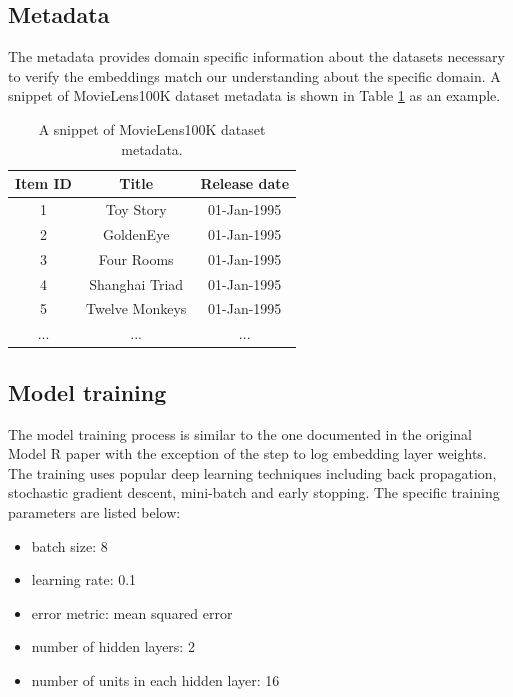 \documentclass[conference]{IEEEtran}
\begin{document}
\subsection{Metadata}
The metadata provides domain specific information about the datasets necessary to verify the embeddings match our understanding about the specific domain. A snippet of MovieLens100K dataset metadata is shown in Table \ref{tab:movielens100kmeta} as an example.
\begin{table}[!ht]
	\centering
	\caption{A snippet of MovieLens100K dataset metadata.}
	\begin{tabular}{ccc} \hline \rowcolor{blue!30}
		Item ID & Title & Release date \\ \hline
		1 & Toy Story & 01-Jan-1995 \\ \hline
		2 & GoldenEye & 01-Jan-1995 \\ \hline
		3 & Four Rooms & 01-Jan-1995 \\ \hline
		4 & Shanghai Triad & 01-Jan-1995 \\ \hline
		5 & Twelve Monkeys & 01-Jan-1995 \\ \hline
		... & ... & ... \\ \hline
	\end{tabular}
	\label{tab:movielens100kmeta}
\end{table}

\subsection{Model training}
The model training process is similar to the one documented in the original Model R paper with the exception of the step to log embedding layer weights.
The training uses popular deep learning techniques including back propagation, stochastic gradient descent, mini-batch and early stopping.
The specific training parameters are listed below:
\begin{itemize}
	\item batch size: 8
	\item learning rate: 0.1
	\item error metric: mean squared error
	\item number of hidden layers: 2
	\item number of units in each hidden layer: 16
\end{itemize}
\end{document}
